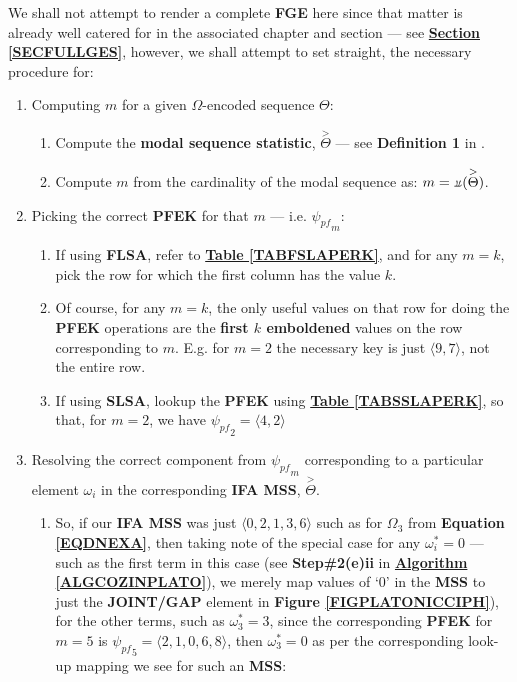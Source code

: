 \documentclass[a4paper, 18pt]{book} %
\newcommand{\invpi}{\rotatebox[origin=c]{180}{$\pi$}}
\begin{document}
\begin{appendices}
We shall not attempt to render a complete \textbf{FGE} here since that matter is already well catered for in the associated chapter and section --- see \textbf{\hyperref[SECFULLGES]{Section \ref{SECFULLGES}}}, however, we shall attempt to set straight, the necessary procedure for:

\begin{enumerate}
\item{Computing $m$ for a given $\Omega$-encoded sequence $\Theta$:

\begin{enumerate}
\item Compute the \textbf{modal sequence statistic}, $\overset{>}{\Theta}$ --- see \textbf{Definition 1} in \cite{transformatics}.
\item Compute $m$ from the cardinality of the modal sequence as: $m = \invpi(\overset{>}{\Theta})$.
\end{enumerate}
}
\item {Picking the correct \textbf{PFEK} for that $m$ --- i.e. $\boxed{\psi_{pf}}_m$:
	\begin{enumerate}
	\item If using \textbf{FLSA}, refer to \textbf{\hyperref[TABFSLAPERK]{Table \ref{TABFSLAPERK}}}, and for any $m = k$, pick the row for which the first column has the value $k$.
	\item Of course, for any $m = k$, the only useful values on that row for doing the \textbf{PFEK} operations are the \textbf{first $k$ emboldened} values on the row corresponding to $m$. E.g. for $m=2$ the necessary key is just $\langle 9, 7 \rangle$, not the entire row.
	\item If using \textbf{SLSA}, lookup the \textbf{PFEK} using \textbf{\hyperref[TABSSLAPERK]{Table \ref{TABSSLAPERK}}}, so that, for $m = 2$, we have $\boxed{\psi_{pf}}_2 = \langle 4, 2 \rangle $
	\end{enumerate}
}
\item{ Resolving the correct component from $\boxed{\psi_{pf}}_m$ corresponding to a particular element $\omega_i$ in the corresponding \textbf{IFA MSS}, $\overset{>}{\Theta}$.
\begin{enumerate}
\item So, if our \textbf{IFA MSS} was just $\langle 0, 2, 1, 3, 6 \rangle$ such as for $\Omega_{3}$ from \textbf{Equation \ref{EQDNEXA}}, then taking note of the special case for any $\omega_i^* = 0$ --- such as the first term in this case (see \textbf{Step\#2(e)ii} in \textbf{\hyperref[ALGCOZINPLATO]{Algorithm \ref{ALGCOZINPLATO}}}), we merely map values of `0' in the \textbf{MSS} to just the \textbf{JOINT/GAP} element in \textbf{Figure \ref{FIGPLATONICCIPH}}), for the other terms, such as $\omega_3^* = 3$, since the corresponding \textbf{PFEK} for $m=5$ is $\boxed{\psi_{pf}}_5 = \langle 2, 1, 0, 6, 8 \rangle $, then $\boxed{\omega_3^*} = 0$ as per the corresponding look-up mapping we see for such an \textbf{MSS}:



\end{enumerate}}
\end{enumerate}
\end{appendices}
\end{document}
